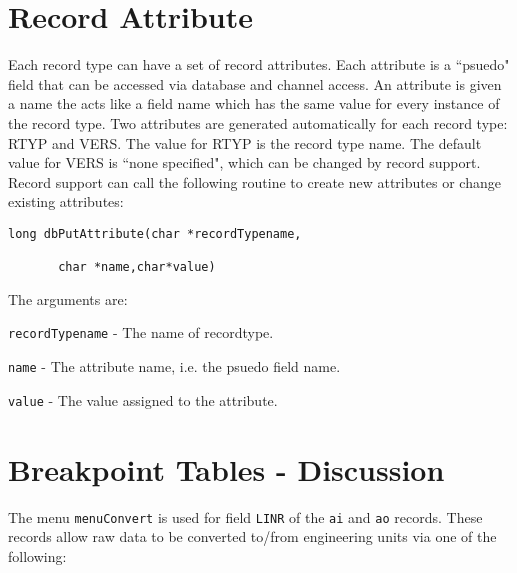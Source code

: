 \section{Record Attribute}

Each record type can have a set of record attributes. Each attribute is a ``psuedo" field that can be accessed via database 
and channel access. An attribute is given a name the acts like a field name which has the same value for every instance of 
the record type. Two attributes are generated automatically for each record type: RTYP and VERS. The value for RTYP is 
the record type name. The default value for VERS is ``none specified", which can be changed by record support. Record 
support can call the following routine to create new attributes or change existing attributes:

\begin{verbatim}long dbPutAttribute(char *recordTypename,

       char *name,char*value)
\end{verbatim}The arguments are:

\begin{description}\item \verb|recordTypename| - The name of recordtype.

\item \verb|name| - The attribute name, i.e. the psuedo field name.

\item \verb|value| - The value assigned to the attribute.

\end{description}\section{Breakpoint Tables - Discussion}

The menu \verb|menuConvert| is used for field \verb|LINR| of the \verb|ai| and \verb|ao| records. These records allow raw data to be converted 
to/from engineering units via one of the following:


